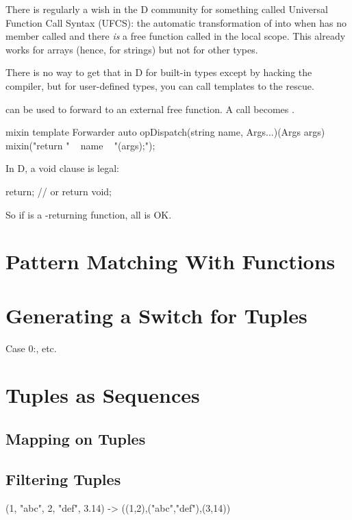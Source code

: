 There is regularly a wish in the D community for something called Universal Function Call Syntax (UFCS): the automatic transformation of  into  when  has no member called  and there \emph{is} a free function called  in the local scope. This already works for arrays (hence, for strings) but not for other types.

There is no way to get that in D for built-in types except by hacking the compiler, but for user-defined types, you can call templates to the rescue.

 can be used to forward to an external free function. A call  becomes .

\begin{dcode}
mixin template Forwarder
{
    auto opDispatch(string name, Args...)(Args args)
    {
        mixin("return " ~ name ~ "(args);");
    }
}
\end{dcode}

In D, a void  clause is legal: 

\begin{dcode}
return;
// or
return void;
\end{dcode}

So if  is a -returning function, all is OK.


\section{Pattern Matching With Functions}

\section{Generating a Switch for Tuples}
Case 0:, etc.

\section{Tuples as Sequences}

\subsection{Mapping on Tuples}

\subsection{Filtering Tuples}

\begin{dcode}
(1, "abc", 2, "def", 3.14)
->
((1,2),("abc","def"),(3,14))
\end{dcode}

